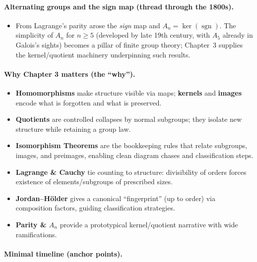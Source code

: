 \documentclass[9pt]{article}
\theoremstyle{definition}
\begin{document}
\newpage

\paragraph{Alternating groups and the sign map (thread through the 1800s).}

\newpage

\begin{itemize}
  \item From Lagrange’s parity arose the \emph{sign} map and $A_n=\ker(\operatorname{sgn})$. The simplicity of $A_n$ for $n\ge5$ (developed by late 19th century, with $A_5$ already in Galois’s sights) becomes a pillar of finite group theory; Chapter~3 supplies the kernel/quotient machinery underpinning such results.
\end{itemize}

\newpage

\paragraph{Why Chapter 3 matters (the “why”).}

\newpage

\begin{itemize}
  \item \textbf{Homomorphisms} make structure visible via maps; \textbf{kernels} and \textbf{images} encode what is forgotten and what is preserved.
  \item \textbf{Quotients} are controlled collapses by normal subgroups; they isolate new structure while retaining a group law.
  \item \textbf{Isomorphism Theorems} are the bookkeeping rules that relate subgroups, images, and preimages, enabling clean diagram chases and classification steps.
  \item \textbf{Lagrange \& Cauchy} tie counting to structure: divisibility of orders forces existence of elements/subgroups of prescribed sizes.
  \item \textbf{Jordan–Hölder} gives a canonical “fingerprint” (up to order) via composition factors, guiding classification strategies.
  \item \textbf{Parity \& $A_n$} provide a prototypical kernel/quotient narrative with wide ramifications.
\end{itemize}

\newpage

\paragraph{Minimal timeline (anchor points).}
\end{document}
